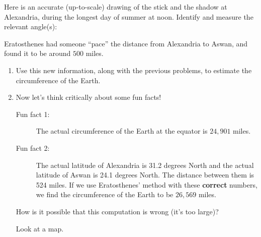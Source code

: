 \documentclass[noauthor,nooutcomes,handout,12pt]{ximera}
\begin{document}
\mynewpage




\begin{question}
  Here is an accurate (up-to-scale) drawing of the stick and the
  shadow at Alexandria, during the longest day of summer at noon.
  Identify and measure the relevant angle(s):
    \begin{center}
    \end{center}

 \end{question}
 \mynewpage

\begin{question}
Eratosthenes had someone ``pace'' the distance from Alexandria
    to Aswan, and found it to be around $500$ miles. 
\begin{enumerate}
 \item Use this new information, along with the previous problems, to
   estimate the circumference of the Earth.
 \item Now let's think critically about some fun facts!
   \begin{description}
   \item[Fun fact 1:] The actual circumference of the Earth at the
     equator is $24,901$ miles.
   \item[Fun fact 2:] The actual latitude of Alexandria is 31.2
     degrees North and the actual latitude of Aswan is 24.1 degrees
     North. The distance between them is 524 miles. If we use
     Eratosthenes' method with these \textbf{correct} numbers, we find
     the circumference of the Earth to be $26,569$ miles.
   \end{description}
   How is it possible that this computation is wrong (it's too large)?
   \begin{hint}
     Look at a map.
   \end{hint}
\end{enumerate}

 \end{question}
\end{document}
